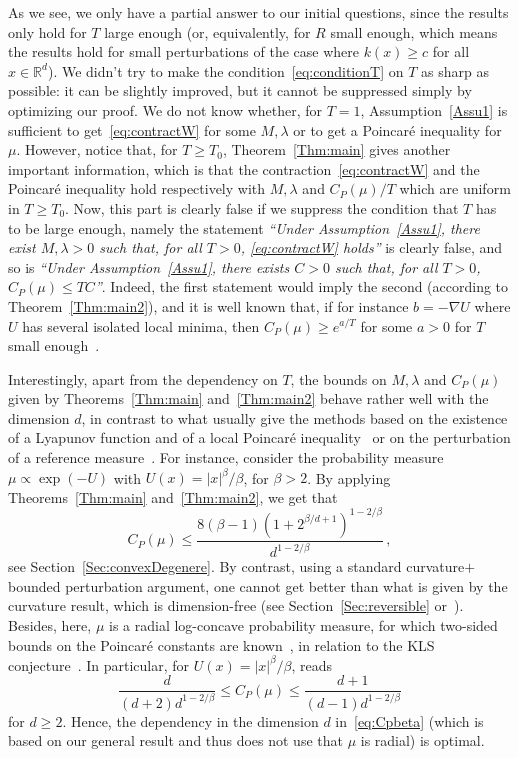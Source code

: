 \documentclass[10pt]{amsart}
\theoremstyle{definition}\newtheorem{defi}[theo]{Definition}\newtheorem{rema}[theo]{Remark}\newtheorem{exam}[theo]{Example}\newtheorem{exem}[theo]{Example}\newtheorem{nota}[theo]{Notation}
\newcommand{\R}{\mathbb R}
\newcommand{\na}{\nabla}
\newcommand{\1}{\mathbbm{1}}
\begin{document}
As we see, we only have a partial answer to our initial questions, since the results only hold for $T$ large enough (or, equivalently, for $R$ small enough, which means the results hold for small perturbations of the case where $k(x)\geqslant c$ for all $x\in\R^d$). We didn't try to make the condition~\eqref{eq:conditionT} on $T$ as sharp as possible: it can be slightly improved, but it cannot be suppressed simply by optimizing our proof. We do not know whether, for $T=1$, Assumption~\ref{Assu1} is sufficient to get~\eqref{eq:contractW} for some $M,\lambda$ or to get a Poincaré inequality for $\mu$. However, notice that, for $T\geqslant T_0$, Theorem~\ref{Thm:main} gives another important information, which is that the contraction~\eqref{eq:contractW} and the Poincaré inequality hold respectively with $M,\lambda$ and $C_P(\mu)/T$ which are uniform in $T\geqslant T_0$. Now, this part is clearly false if we suppress the condition that $T$ has to be large enough, namely the statement \emph{``Under Assumption~\ref{Assu1}, there exist $M,\lambda>0$ such that, for all $T>0$, \eqref{eq:contractW} holds''} is clearly false, and so is \emph{``Under Assumption~\ref{Assu1}, there exists $C>0$ such that, for all $T>0$, $C_P(\mu) \leqslant TC$''}. Indeed, the first statement would imply the second (according to Theorem~\ref{Thm:main2}), and it is well known that, if for instance $b=-\na U$ where $U$ has several isolated local minima, then $C_P(\mu)\geqslant e^{a/T}$ for some $a>0$ for $T$ small enough~\cite{HKS,MenzSchlichting}.



Interestingly, apart from the dependency on $T$, the bounds on $M,\lambda$ and $ C_P(\mu)$ given by Theorems~\ref{Thm:main} and~\ref{Thm:main2} behave rather well with the dimension $d$, in contrast to what usually give the methods based on the existence of a Lyapunov function and of a local Poincaré inequality~\cite{BakryCattiauxGuillin,CattiauxGuillin} or on the perturbation of a reference measure~\cite{HKS}. For instance, consider the probability measure $\mu\propto \exp(-U)$ with $U(x)=|x|^\beta/\beta$, for $\beta>2$. By applying Theorems~\ref{Thm:main} and~\ref{Thm:main2}, we get that
\begin{equation}\label{eq:Cpbeta}
C_P(\mu) \leqslant \frac{ 8 (\beta-1) \left( 1+ 2^{\beta/d+1} \right)^{1-2/\beta}}{d^{1-2/\beta}}\,,
\end{equation}
see Section~\ref{Sec:convexDegenere}. By contrast, using a standard curvature$+$bounded perturbation argument, one cannot get better than what is given by the curvature result, which is dimension-free (see Section~\ref{Sec:reversible} or~\cite[Remark~5.21]{CattiauxGuillinSLC}). Besides, here, $\mu$ is a radial log-concave probability measure, for which two-sided bounds on the Poincaré constants are known~\cite{BonnefontJoulinMa,Bobkov}, in relation to the KLS conjecture~\cite{ChenKLS,LeeVempala}. In particular, for $U(x) =|x|^\beta/\beta$, \cite[Corollary~4.2]{BonnefontJoulinMa} reads
\[
\frac{d}{(d+2) d^{1-2/\beta}} \leqslant C_P(\mu) \leqslant \frac{d+1}{(d-1) d^{1-2/\beta}}
\]
for $d\geqslant 2$. Hence, the dependency in the dimension $d$ in~\eqref{eq:Cpbeta} (which is based on our general result and thus does not use that $\mu$ is radial) is optimal.
\end{document}
